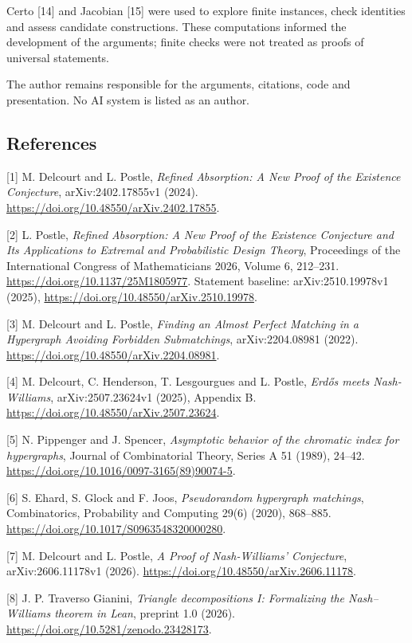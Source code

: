 \documentclass[english,11pt,a4paper]{article}
\begin{document}
Certo {[}14{]} and Jacobian {[}15{]} were used to explore finite instances, check identities and assess candidate constructions. These computations informed the development of the arguments; finite checks were not treated as proofs of universal statements.

The author remains responsible for the arguments, citations, code and presentation. No AI system is listed as an author.

\subsection{References}\label{references}

\begingroup\small\raggedright
\setlength{\parskip}{0pt}

{[}1{]} M. Delcourt and L. Postle, \emph{Refined Absorption: A New Proof of the Existence Conjecture}, arXiv:2402.17855v1 (2024). \url{https://doi.org/10.48550/arXiv.2402.17855}.

{[}2{]} L. Postle, \emph{Refined Absorption: A New Proof of the Existence Conjecture and Its Applications to Extremal and Probabilistic Design Theory}, Proceedings of the International Congress of Mathematicians 2026, Volume 6, 212--231. \url{https://doi.org/10.1137/25M1805977}. Statement baseline: arXiv:2510.19978v1 (2025), \url{https://doi.org/10.48550/arXiv.2510.19978}.

{[}3{]} M. Delcourt and L. Postle, \emph{Finding an Almost Perfect Matching in a Hypergraph Avoiding Forbidden Submatchings}, arXiv:2204.08981 (2022). \url{https://doi.org/10.48550/arXiv.2204.08981}.

{[}4{]} M. Delcourt, C. Henderson, T. Lesgourgues and L. Postle, \emph{Erdős meets Nash-Williams}, arXiv:2507.23624v1 (2025), Appendix B. \url{https://doi.org/10.48550/arXiv.2507.23624}.

{[}5{]} N. Pippenger and J. Spencer, \emph{Asymptotic behavior of the chromatic index for hypergraphs}, Journal of Combinatorial Theory, Series A 51 (1989), 24--42. \url{https://doi.org/10.1016/0097-3165(89)90074-5}.

{[}6{]} S. Ehard, S. Glock and F. Joos, \emph{Pseudorandom hypergraph matchings}, Combinatorics, Probability and Computing 29(6) (2020), 868--885. \url{https://doi.org/10.1017/S0963548320000280}.

{[}7{]} M. Delcourt and L. Postle, \emph{A Proof of Nash-Williams' Conjecture}, arXiv:2606.11178v1 (2026). \url{https://doi.org/10.48550/arXiv.2606.11178}.

{[}8{]} J. P. Traverso Gianini, \emph{Triangle decompositions I: Formalizing the Nash--Williams theorem in Lean}, preprint 1.0 (2026). \url{https://doi.org/10.5281/zenodo.23428173}.
\end{document}
